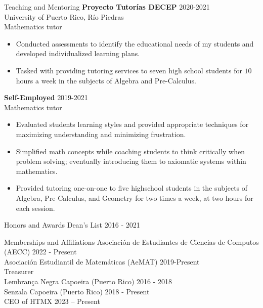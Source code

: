 \documentclass{resume} %
\begin{document}
\begin{rSection}{Teaching and Mentoring}
    \textbf{Proyecto Tutor\'ias DECEP} \hfill{2020-2021} \\
    University of Puerto Rico, R\'io Piedras \\
    Mathematics tutor
    \begin{itemize}
        \item Conducted assessments to identify the educational needs of my
            students and developed individualized learning plans.

        \item Tasked with providing tutoring services to seven high school
            students for $10$ hours a week in the subjects of Algebra and
            Pre-Calculus.
    \end{itemize}

    \textbf{Self-Employed} \hfill{2019-2021} \\
    Mathematics tutor

    \begin{itemize}
        \item Evaluated students learning styles and provided appropriate
            techniques for maximizing understanding and minimizing frustration.

        \item Simplified math concepts while coaching students to think
            critically when problem solving; eventually introducing them to
            axiomatic systems within mathematics.

        \item Provided tutoring one-on-one to five highschool students in the
            subjects of Algebra, Pre-Calculus, and Geometry for two times a
            week, at two hours for each session.
    \end{itemize}
\end{rSection}

\begin{rSection}{Honors and Awards}
    Dean's List \hfill{2016 - 2021}
\end{rSection}

\begin{rSection}{Memberships and Affiliations}
    Asociaci\'on de Estudiantes de Ciencias de Computos (AECC) \hfill{2022 - Present} \\

    Asociaci\'on Estudiantil de Matem\'aticas (AeMAT) \hfill{2019-Present} \\

    \hspace*{17mm} Treasurer    \\

    Lembran\c{c}a Negra Capoeira (Puerto Rico) \hfill{2016 - 2018} \\

    Senzala Capoeira (Puerto Rico) \hfill{2018 - Present} \\

    CEO of HTMX \hfill{2023 -- Present} \\
\end{rSection}
\end{document}
